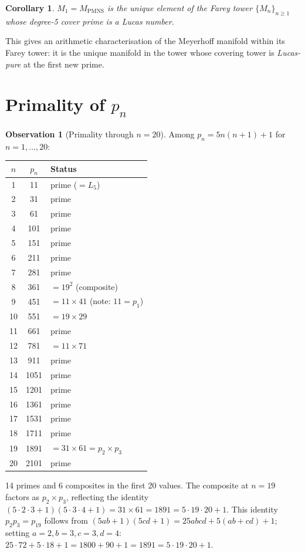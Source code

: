 \documentclass[11pt,a4paper]{article}
\newtheorem{corollary}[theorem]{Corollary}
\theoremstyle{definition}
\newtheorem{observation}[theorem]{Observation}
\newcommand{\Mn}{M_n}
\newcommand{\MPMNS}{M_{\mathrm{PMNS}}}
\begin{document}
\begin{corollary}
$M_1 = \MPMNS$ is the unique element of the Farey tower
$\{\Mn\}_{n\geq 1}$ whose degree-5 cover prime is a Lucas number.
\end{corollary}

This gives an arithmetic characterisation of the Meyerhoff manifold
within its Farey tower: it is the unique manifold in the tower
whose covering tower is \emph{Lucas-pure} at the first new prime.

\section{Primality of \texorpdfstring{$p_n$}{p\_n}}
\label{sec:primes}

\begin{observation}[Primality through $n=20$]
Among $p_n = 5n(n+1)+1$ for $n=1,\ldots,20$:

\begin{center}
\begin{tabular}{ccl}
\toprule
$n$ & $p_n$ & Status \\
\midrule
1  &  11 & prime ($=L_5$) \\
2  &  31 & prime \\
3  &  61 & prime \\
4  & 101 & prime \\
5  & 151 & prime \\
6  & 211 & prime \\
7  & 281 & prime \\
8  & 361 & $= 19^2$ (composite) \\
9  & 451 & $= 11 \times 41$ (note: $11 = p_1$) \\
10 & 551 & $= 19 \times 29$ \\
11 & 661 & prime \\
12 & 781 & $= 11 \times 71$ \\
13 & 911 & prime \\
14 & 1051 & prime \\
15 & 1201 & prime \\
16 & 1361 & prime \\
17 & 1531 & prime \\
18 & 1711 & prime \\
19 & 1891 & $= 31 \times 61 = p_2 \times p_3$ \\
20 & 2101 & prime \\
\bottomrule
\end{tabular}
\end{center}

14 primes and 6 composites in the first 20 values.
The composite at $n=19$ factors as $p_2 \times p_3$,
reflecting the identity
$(5\cdot2\cdot3+1)(5\cdot3\cdot4+1) = 31\times61 = 1891
= 5\cdot19\cdot20+1$.
This identity $p_2 p_3 = p_{19}$ follows from
$(5ab+1)(5cd+1) = 25abcd + 5(ab+cd) + 1$;
setting $a=2,b=3,c=3,d=4$: $25\cdot72 + 5\cdot18 + 1
= 1800+90+1 = 1891 = 5\cdot19\cdot20+1$.
\end{observation}
\end{document}
